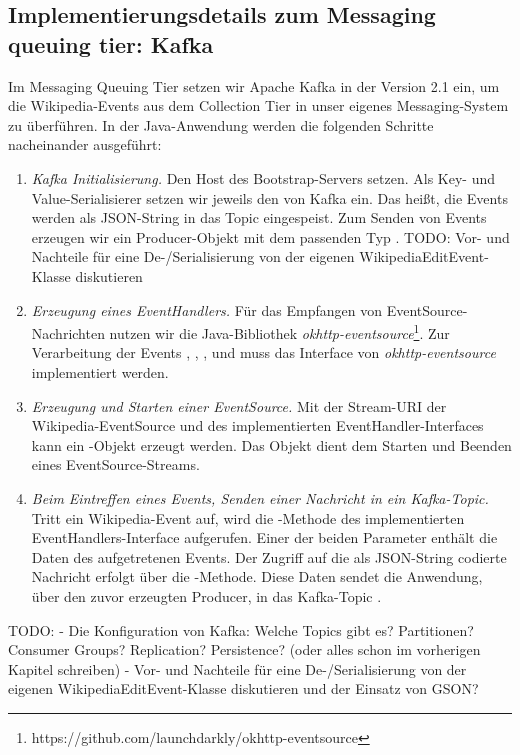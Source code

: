 \subsection{Implementierungsdetails zum Messaging queuing tier: Kafka}
Im Messaging Queuing Tier setzen wir Apache Kafka in der Version 2.1 ein, um die Wikipedia-Events aus dem Collection Tier
in unser eigenes Messaging-System zu überführen. In der Java-Anwendung werden die folgenden
Schritte nacheinander ausgeführt:
\begin{enumerate}
    \item \textit{Kafka Initialisierung.} Den Host des Bootstrap-Servers setzen. Als Key- und Value-Serialisierer setzen wir
    jeweils den  von Kafka ein. Das heißt, die Events werden als JSON-String in das Topic 
    eingespeist. Zum Senden von Events erzeugen wir ein Producer-Objekt mit dem passenden Typ .
    TODO: Vor- und Nachteile für eine De-/Serialisierung von der eigenen WikipediaEditEvent-Klasse diskutieren
    \item \textit{Erzeugung eines EventHandlers.} Für das Empfangen von EventSource-Nachrichten nutzen wir die Java-Bibliothek
    \textit{okhttp-eventsource}\footnote{https://github.com/launchdarkly/okhttp-eventsource}. Zur Verarbeitung der Events
    , , ,  und  muss das Interface  von
    \textit{okhttp-eventsource} implementiert werden.
    \item \textit{Erzeugung und Starten einer EventSource.} Mit der Stream-URI der Wikipedia-EventSource und des implementierten EventHandler-Interfaces
    kann ein -Objekt erzeugt werden. Das Objekt dient dem Starten und Beenden eines EventSource-Streams.
    \item \textit{Beim Eintreffen eines Events, Senden einer Nachricht in ein Kafka-Topic.} Tritt ein Wikipedia-Event auf,
    wird die -Methode des implementierten EventHandlers-Interface aufgerufen. Einer der beiden Parameter enthält die Daten
    des aufgetretenen Events. Der Zugriff auf die als JSON-String codierte Nachricht erfolgt über die -Methode.
    Diese Daten sendet die Anwendung, über den zuvor erzeugten Producer, in das Kafka-Topic .
\end{enumerate}

TODO:
- Die Konfiguration von Kafka: Welche Topics gibt es? Partitionen? Consumer Groups? Replication? Persistence? (oder alles schon im vorherigen Kapitel schreiben)
- Vor- und Nachteile für eine De-/Serialisierung von der eigenen WikipediaEditEvent-Klasse diskutieren und der Einsatz von GSON?


